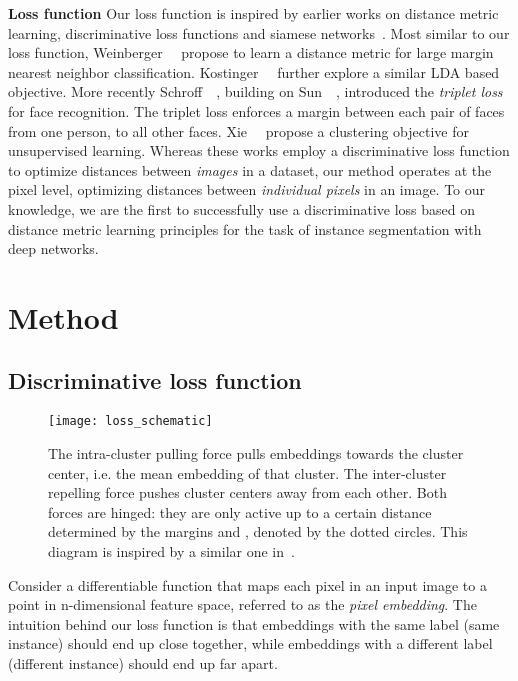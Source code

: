 \documentclass[10pt,twocolumn,letterpaper]{article}
\begin{document}
\textbf{Loss function} 
Our loss function is inspired by earlier works on distance metric learning, discriminative loss functions and siamese networks~\cite{bromley1993signature, chopra2005learning, hadsell2006dimensionality, weinberger2009distance, koestinger2012large}.
Most similar to our loss function, Weinberger~\etal~\cite{weinberger2009distance} propose to learn a distance metric for large margin nearest neighbor classification. Kostinger~\etal~\cite{koestinger2012large} further explore a similar LDA based objective.
More recently Schroff~\etal~\cite{schroff2015facenet}, building on Sun~\etal~\cite{wang2014learning}, introduced the \textit{triplet loss} for face recognition. The triplet loss enforces a margin between each pair of faces from one person, to all other faces. 
Xie~\etal~\cite{xie2015unsupervised} propose a clustering objective for unsupervised learning. 
Whereas these works employ a discriminative loss function to optimize distances between \textit{images} in a dataset, our method operates at the pixel level, optimizing distances between \textit{individual pixels} in an image. To our knowledge, we are the first to successfully use a discriminative loss based on distance metric learning principles for the task of instance segmentation with deep networks.
% 
\section{Method}
\label{sec:method}
\subsection{Discriminative loss function}

\begin{figure}
	\begin{center}
\texttt{[image: loss\_schematic]}
	\end{center}
	\caption{The intra-cluster pulling force pulls embeddings towards the cluster center, i.e. the mean embedding of that cluster. The inter-cluster repelling force pushes cluster centers away from each other. Both forces are hinged: they are only active up to a certain distance determined by the margins  and , denoted by the dotted circles. This diagram is inspired by a similar one in~\cite{weinberger2009distance}.}
	\label{fig:loss}
\end{figure}
Consider a differentiable function that maps each pixel in an input image to a point in n-dimensional feature space, referred to as the \textit{pixel embedding}. The intuition behind our loss function is that embeddings with the same label (same instance) should end up close together, while embeddings with a different label (different instance) should end up far apart.
\end{document}
